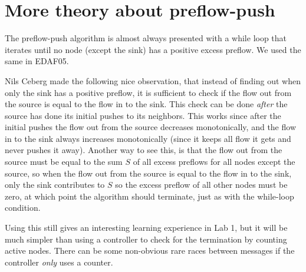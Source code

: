 \documentclass{forsete}
\begin{document}
\section{More theory about preflow-push}
The preflow-push algorithm is almost always presented with a while loop that iterates until no node (except the sink) has a positive excess preflow. We used the same in EDAF05.

Nils Ceberg made the following nice observation, that instead of finding out when only the sink has a 
positive preflow, it is sufficient to check 
if the  flow out from the source is equal to the flow in to the sink. This check can be done
{\em after} the source has done its initial pushes to its neighbors. This works
since after the initial pushes the flow out from the source decreases monotonically, and the flow in
to the sink always increases monotonically (since it keeps all flow it gets and never pushes it away).
Another way to see this, is that the flow out from the source must be 
equal to the sum $S$ of all excess preflows for all nodes except the source, so when the flow out from the source
is equal to the flow in to the sink, only the sink contributes to $S$ so the excess preflow of all other nodes
must be zero, at which point the algorithm should terminate, just as with the while-loop condition.

Using this still gives an interesting learning experience in Lab 1, but it will be much simpler than using a
controller to check for the termination by counting active nodes. There can be some non-obvious rare races between messages if 
the controller {\em only} uses a counter.
\end{document}
